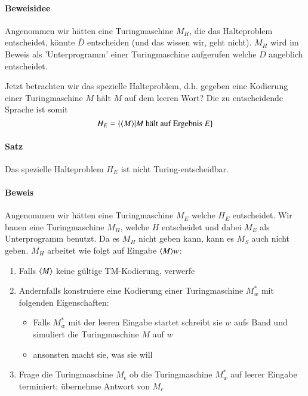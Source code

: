 \paragraph*{Beweisidee} Angenommen wir hätten eine Turingmaschine $M_H$, die das Halteproblem entscheidet, könnte $\overline{D}$ entscheiden (und das wissen wir, geht nicht). $M_H$ wird im Beweis als 'Unterprogramm' einer Turingmaschine aufgerufen welche $\overline{D}$ angeblich entscheidet.

\par\medskip Jetzt betrachten wir das spezielle Halteproblem, d.h. gegeben eine Kodierung einer Turingmaschine $M$
hält $M$ auf dem leeren Wort? Die zu entscheidende Sprache ist somit $$ H_E = \{ \langle M \rangle | M \text{ hält auf Ergebnis }  E \} $$\par\medskip

\paragraph*{Satz} Das spezielle Halteproblem $H_E$ ist nicht Turing-entscheidbar.

\paragraph*{Beweis} Angenommen wir hätten eine Turingmaschine $M_E$ welche $H_E$ entscheidet. Wir bauen eine Turingmaschine $M_H$, welche $H$ entscheidet und dabei $M_E$ als Unterprogramm benutzt. Da es $M_H$ nicht geben kann, kann es $M_S$ auch nicht geben. $M_H$ arbeitet wie folgt auf Eingabe $\langle M \rangle w$:
\begin{enumerate}
	\item Falls $\langle M \rangle$ keine gültige TM-Kodierung, verwerfe
	\item Andernfalls konstruiere eine Kodierung einer Turingmaschine $M_w^*$ mit folgenden Eigenschaften:
	\begin{itemize}
		\item Falls $M_w^*$ mit der leeren Eingabe startet schreibt sie $w$ aufs Band und simuliert die Turingmaschine $M$ auf $w$
		\item ansonsten macht sie, was sie will
	\end{itemize}
	\item Frage die Turingmaschine $M_\epsilon$ ob die Turingmaschine $M_w^*$ auf leerer Eingabe terminiert; übernehme Antwort von $M_\epsilon$
\end{enumerate}

